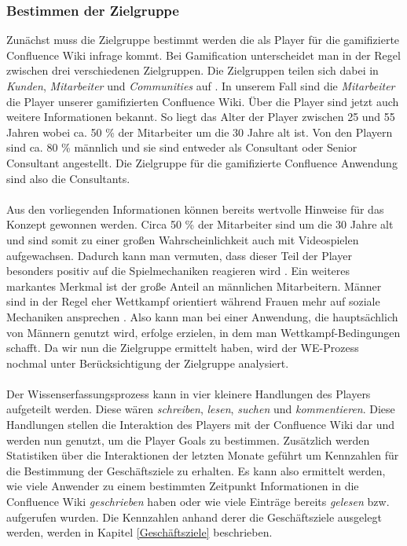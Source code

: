 \documentclass[a4paper,12pt]{scrartcl}
\begin{document}
\subsubsection{Bestimmen der Zielgruppe}
\label{Zielgruppe}
Zunächst muss die Zielgruppe bestimmt werden die als Player für die gamifizierte Confluence Wiki infrage kommt. Bei Gamification unterscheidet man in der Regel zwischen drei verschiedenen Zielgruppen. Die Zielgruppen teilen sich dabei in \textit{Kunden}, \textit{Mitarbeiter} und \textit{Communities} auf \cite{gamificationDefinition}. In unserem Fall sind die \textit{Mitarbeiter} die Player unserer gamifizierten Confluence Wiki. Über die Player sind jetzt auch weitere Informationen bekannt. So liegt das Alter der Player zwischen 25 und 55 Jahren wobei ca. 50 \% der Mitarbeiter um die 30 Jahre alt ist. Von den Playern sind ca. 80 \% männlich und sie sind entweder als Consultant oder Senior Consultant angestellt. Die Zielgruppe für die gamifizierte Confluence Anwendung sind also die Consultants. 
\\\\
Aus den vorliegenden Informationen können bereits wertvolle Hinweise für das Konzept gewonnen werden. Circa 50 \% der Mitarbeiter sind um die 30 Jahre alt und sind somit zu einer großen Wahrscheinlichkeit auch mit Videospielen aufgewachsen. Dadurch kann man vermuten, dass dieser Teil der Player besonders positiv auf die Spielmechaniken reagieren wird \cite{Persona2018}. Ein weiteres markantes Merkmal ist der große Anteil an männlichen Mitarbeitern. Männer sind in der Regel eher Wettkampf orientiert während Frauen mehr auf soziale Mechaniken ansprechen \cite{Persona2018}. Also kann man bei einer Anwendung, die hauptsächlich von Männern genutzt wird, erfolge erzielen, in dem man Wettkampf-Bedingungen schafft. Da wir nun die Zielgruppe ermittelt haben, wird der WE-Prozess nochmal unter Berücksichtigung der Zielgruppe analysiert. 
\\\\
Der Wissenserfassungsprozess kann in vier kleinere Handlungen des Players aufgeteilt werden. Diese wären \textit{schreiben}, \textit{lesen}, \textit{suchen} und \textit{kommentieren}. Diese Handlungen stellen die Interaktion des Players mit der Confluence Wiki dar und werden nun genutzt, um die Player Goals zu bestimmen. Zusätzlich werden Statistiken über die Interaktionen der letzten Monate geführt um Kennzahlen für die Bestimmung der Geschäftsziele zu erhalten. Es kann also ermittelt werden, wie viele Anwender zu einem bestimmten Zeitpunkt Informationen in die Confluence Wiki \textit{geschrieben} haben oder wie viele Einträge bereits \textit{gelesen} bzw. aufgerufen wurden. Die Kennzahlen anhand derer die Geschäftsziele ausgelegt werden, werden in Kapitel \ref{Geschäftsziele} beschrieben.
\end{document}
